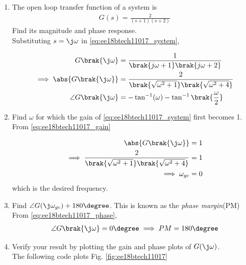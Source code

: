 \begin{enumerate}[label=\thesection.\arabic*.,ref=\thesection.\theenumi]

\item The open loop transfer function of a system is 
\begin{align}
G(s) = \frac{2}{(s+1)(s+2)}
\label{eq:ee18btech11017_system}
\end{align}
Find its magnitude and phase response.
\\
\solution Substituting $s = \j\omega$ in \eqref{eq:ee18btech11017_system},

\begin{align}
G\brak{\j\omega}&=\frac{1}{\brak{j\omega+1}\brak{j\omega+2}} 
\\
\implies 
\abs{G\brak{\j\omega}}&=\frac{2}{\brak{\sqrt{\omega^2+1}}\brak{\sqrt{\omega^2+4}}}
\label{eq:ee18btech11017_gain}
\\
\angle G\brak{\j\omega}&=- \tan^{-1}(\omega) - \tan^{-1}\brak{\frac{\omega}{2}} 
\label{eq:ee18btech11017_phase}
\end{align}

\item Find $\omega$ for which the gain of \eqref{eq:ee18btech11017_system} first becomes 1.
\\
\solution From \eqref{eq:ee18btech11017_gain}

\begin{align}
\abs{G\brak{\j\omega}}&=1
\\
\implies \frac{2}{\brak{\sqrt{\omega^2+1}}\brak{\sqrt{\omega^2+4}}}&=1
\\
\implies \omega_{gc}&=0
\end{align}
which is the desired frequency.

\item Find $\angle G(\j\omega_{gc}) + 180\degree$.  This is known as the {\em phase margin}(PM)
\\
\solution From \eqref{eq:ee18btech11017_phase},
%
\begin{align}
\angle G\brak{\j\omega} = 0\degree
\implies PM=180\degree
\label{eq:ee18btech11017_pm}
\end{align}
%
\item Verify your result by plotting the gain and phase plots of $G(\j\omega)$.
\\
\solution The following code plots Fig. \ref{fig:ee18btech11017}


\end{enumerate}
